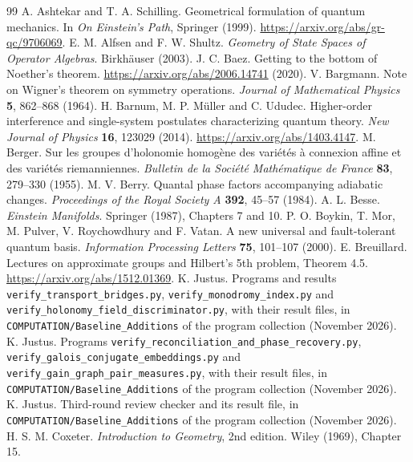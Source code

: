 \documentclass[11pt,a4paper]{article}
\begin{document}
\setcounter{page}{2}
\setcounter{section}{0}

\clearpage
\begin{thebibliography}{99}
 A. Ashtekar and T. A. Schilling. Geometrical formulation of quantum mechanics. In \emph{On Einstein's Path}, Springer (1999). \url{https://arxiv.org/abs/gr-qc/9706069}.
 E. M. Alfsen and F. W. Shultz. \emph{Geometry of State Spaces of Operator Algebras}. Birkh\"auser (2003).
 J. C. Baez. Getting to the bottom of Noether's theorem. \url{https://arxiv.org/abs/2006.14741} (2020).
 V. Bargmann. Note on Wigner's theorem on symmetry operations. \emph{Journal of Mathematical Physics} \textbf{5}, 862--868 (1964).
 H. Barnum, M. P. M\"uller and C. Ududec. Higher-order interference and single-system postulates characterizing quantum theory. \emph{New Journal of Physics} \textbf{16}, 123029 (2014). \url{https://arxiv.org/abs/1403.4147}.
 M. Berger. Sur les groupes d'holonomie homog\`ene des vari\'et\'es \`a connexion affine et des vari\'et\'es riemanniennes. \emph{Bulletin de la Soci\'et\'e Math\'ematique de France} \textbf{83}, 279--330 (1955).
 M. V. Berry. Quantal phase factors accompanying adiabatic changes. \emph{Proceedings of the Royal Society A} \textbf{392}, 45--57 (1984).
 A. L. Besse. \emph{Einstein Manifolds}. Springer (1987), Chapters 7 and 10.
 P. O. Boykin, T. Mor, M. Pulver, V. Roychowdhury and F. Vatan. A new universal and fault-tolerant quantum basis. \emph{Information Processing Letters} \textbf{75}, 101--107 (2000).
 E. Breuillard. Lectures on approximate groups and Hilbert's 5th problem, Theorem 4.5. \url{https://arxiv.org/abs/1512.01369}.
 K. Justus. Programs and results \texttt{verify\_transport\_bridges.py}, \texttt{verify\_monodromy\_index.py} and \texttt{verify\_holonomy\_field\_discriminator.py}, with their result files, in \texttt{COMPUTATION/Baseline\_Additions} of the program collection (November 2026).
 K. Justus. Programs \texttt{verify\_reconciliation\_and\_phase\_recovery.py}, \texttt{verify\_galois\_conjugate\_embeddings.py} and \texttt{verify\_gain\_graph\_pair\_measures.py}, with their result files, in \texttt{COMPUTATION/Baseline\_Additions} of the program collection (November 2026).
 K. Justus. Third-round review checker and its result file, in \texttt{COMPUTATION/Baseline\_Additions} of the program collection (November 2026).
 H. S. M. Coxeter. \emph{Introduction to Geometry}, 2nd edition. Wiley (1969), Chapter 15.

\end{thebibliography}
\end{document}
